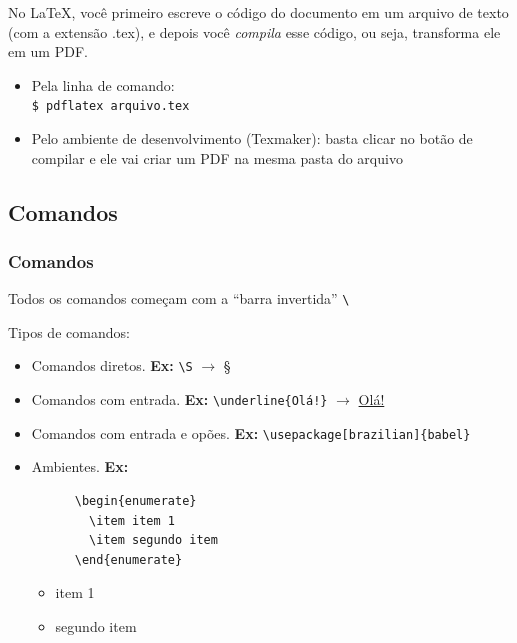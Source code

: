 \documentclass[12pt]{beamer}
\begin{document}
\begin{frame}[fragile]
  No \LaTeX, você primeiro escreve o código do documento em um arquivo de texto (com a extensão .tex), e depois você \emph{compila} esse código, ou seja, transforma ele em um PDF.

  \begin{itemize}
    \item Pela linha de comando:\\
    \verb+$ pdflatex arquivo.tex+
    \item Pelo ambiente de desenvolvimento (Texmaker): basta clicar no botão de compilar e ele vai criar um PDF na mesma pasta do arquivo
  \end{itemize}
\end{frame}

\begin{frame}[fragile]
  \section{Comandos}
  \frametitle{Comandos}
  Todos os comandos começam com a ``barra invertida'' \verb+\+
  \medskip

  Tipos de comandos:
  \begin{itemize}
    \item Comandos diretos. \textbf{Ex:} \verb+\S+ $\rightarrow$ \S

    \item Comandos com entrada. \textbf{Ex:} \verb+\underline{Olá!}+ $\rightarrow$ \underline{Olá!}

  \end{itemize}
\end{frame}

\begin{frame}[fragile]
  \begin{itemize}
    \item Comandos com entrada e opões. \textbf{Ex:} \verb+\usepackage[brazilian]{babel}+

    \item Ambientes. \textbf{Ex:}
    \begin{verbatim}
      \begin{enumerate}
        \item item 1
        \item segundo item
      \end{enumerate}
    \end{verbatim}
    \begin{itemize}
      \item item 1
      \item segundo item
    \end{itemize}
  \end{itemize}
\end{frame}
\end{document}
